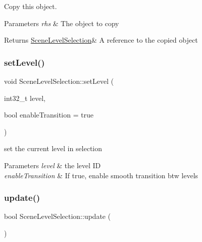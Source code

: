 Copy this object. 


\begin{DoxyParams}{Parameters}
{\em rhs} & The object to copy \\
\hline
\end{DoxyParams}
\begin{DoxyReturn}{Returns}
\hyperlink{class_scene_level_selection}{Scene\+Level\+Selection}\& A reference to the copied object 
\end{DoxyReturn}
\mbox{\label{class_scene_level_selection_afbaae9b76f321067588bee9a63f89d3c}} 
\subsubsection{\texorpdfstring{set\+Level()}{setLevel()}}
{\footnotesize\ttfamily void Scene\+Level\+Selection\+::set\+Level (\begin{DoxyParamCaption}\item[{int32\+\_\+t}]{level,  }\item[{bool}]{enable\+Transition = {\ttfamily true} }\end{DoxyParamCaption})}



set the current level in selection 


\begin{DoxyParams}{Parameters}
{\em level} & the level ID \\
\hline
{\em enable\+Transition} & If true, enable smooth transition btw levels \\
\hline
\end{DoxyParams}
\mbox{\label{class_scene_level_selection_a9784885da4583eaba695812bedf8847c}} 
\subsubsection{\texorpdfstring{update()}{update()}}
{\footnotesize\ttfamily bool Scene\+Level\+Selection\+::update (\begin{DoxyParamCaption}{ }\end{DoxyParamCaption})\hspace{0.3cm}{\ttfamily [virtual]}}




